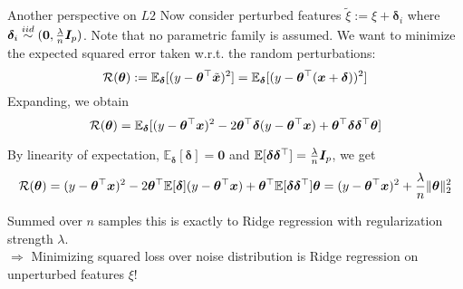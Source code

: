 \documentclass[11pt,compress,t,notes=noshow, xcolor=table]{beamer}
\begin{document}
\begin{vbframe}{Another perspective on $L2$}
Now consider perturbed features $ \tilde{\xi}:= \xi + \bm{\delta}_i$ where $\bm{\delta}_i \overset{iid}{\sim} (\bm{0},\frac{\lambda}{n} \boldsymbol{I}_p)$. Note that no parametric family is assumed. We want to minimize the expected squared error taken w.r.t. the random perturbations:
$$\mathcal{R}(\bm{\theta}):= \mathbb{E}_{\bm{\delta}}[(y-\bm{\theta}^{\top}\tilde{\bm{x}})^2] = \mathbb{E}_{\bm{\delta}}[(y-\bm{\theta}^{\top}(\bm{x}+\bm{\delta}))^2]$$
Expanding, we obtain
$$\mathcal{R}(\bm{\theta}) = \mathbb{E}_{\bm{\delta}}[(y-\bm{\theta}^{\top}\bm{x})^2 - 2 \bm{\theta}^{\top}\bm{\delta}(y-\bm{\theta}^{\top}\bm{x}) + \bm{\theta}^{\top}\bm{\delta}\bm{\delta}^{\top}\bm{\theta}]$$

By linearity of expectation, $\mathbb{E}_{\bm{\delta}}[\bm{\delta}]=\bm{0}$ and $\mathbb{E}[\bm{\delta}\bm{\delta}^{\top}]=\frac{\lambda}{n} \boldsymbol{I}_p$, we get
$$\mathcal{R}(\bm{\theta})=(y-\bm{\theta}^{\top}\bm{x})^2 - 2 \bm{\theta}^{\top}\mathbb{E}[\bm{\delta}](y-\bm{\theta}^{\top}\bm{x}) + \bm{\theta}^{\top}\mathbb{E}[\bm{\delta}\bm{\delta}^{\top}]\bm{\theta} = (y-\bm{\theta}^{\top}\bm{x})^2+\frac{\lambda}{n} \Vert \bm{\theta} \Vert_2^2$$

Summed over $n$ samples this is exactly to Ridge regression with regularization strength $\lambda$.\\
$\Longrightarrow$ Minimizing squared loss over noise distribution is Ridge regression on unperturbed features $\xi$!

\end{vbframe}






\endlecture
\end{document}
